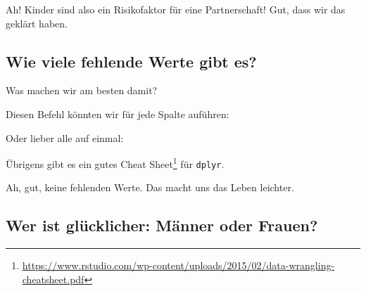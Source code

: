 \documentclass[12pt,ngerman,]{book}
\makeatletter
\newenvironment{Shaded}{\begin{snugshade}}{\end{snugshade}}
\newcommand{\KeywordTok}[1]{\textcolor[rgb]{0.13,0.29,0.53}{\textbf{{#1}}}}
\newcommand{\DataTypeTok}[1]{\textcolor[rgb]{0.13,0.29,0.53}{{#1}}}
\newcommand{\StringTok}[1]{\textcolor[rgb]{0.31,0.60,0.02}{{#1}}}
\newcommand{\CommentTok}[1]{\textcolor[rgb]{0.56,0.35,0.01}{\textit{{#1}}}}
\newcommand{\NormalTok}[1]{{#1}}
\let\rmarkdownfootnote\footnote%
\def\footnote{\protect\rmarkdownfootnote}
\renewcommand{\href}[2]{#2\footnote{\url{#1}}}
\newenvironment{kframe}{%
\medskip{}
\setlength{\fboxsep}{.8em}
 \def\at@end@of@kframe{}%
 \ifinner\ifhmode%
  \def\at@end@of@kframe{\end{minipage}}%
  \begin{minipage}{\columnwidth}%
 \fi\fi%
 \def\FrameCommand##1{\hskip\@totalleftmargin \hskip-\fboxsep
 \colorbox{shadecolor}{##1}\hskip-\fboxsep
     \hskip-\linewidth \hskip-\@totalleftmargin \hskip\columnwidth}%
 \MakeFramed {\advance\hsize-\width
   \@totalleftmargin\z@ \linewidth\hsize
   \@setminipage}}%
 {\par\unskip\endMakeFramed%
 \at@end@of@kframe}
\renewenvironment{Shaded}{\begin{kframe}}{\end{kframe}}
\theoremstyle{definition}
\theoremstyle{definition}
\theoremstyle{remark}
\makeatother
\begin{document}
Ah! Kinder sind also ein Risikofaktor für eine Partnerschaft! Gut, dass
wir das geklärt haben.

\subsection{Wie viele fehlende Werte gibt
es?}\label{wie-viele-fehlende-werte-gibt-es}

Was machen wir am besten damit?

Diesen Befehl könnten wir für jede Spalte auführen:

\begin{Shaded}
\end{Shaded}

Oder lieber alle auf einmal:

\begin{Shaded}
\end{Shaded}

Übrigens gibt es ein gutes
\href{https://www.rstudio.com/wp-content/uploads/2015/02/data-wrangling-cheatsheet.pdf}{Cheat
Sheet} für \texttt{dplyr}.

Ah, gut, keine fehlenden Werte. Das macht uns das Leben leichter.

\subsection{Wer ist glücklicher: Männer oder
Frauen?}\label{wer-ist-glucklicher-manner-oder-frauen}

\begin{Shaded}
\end{Shaded}
\end{document}
